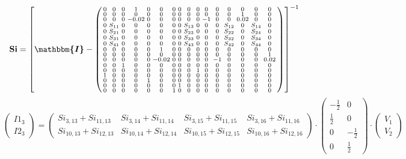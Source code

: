 \documentclass[10pt]{article} \usepackage{amsmath} \usepackage{bbold}
\begin{document}
\[ \mathbf{Si} = \left[ \boldsymbol{\mathbbm{I}}  -
\left(\begin{smallmatrix} 0 & 0 & 0 & 1 & 0 & 0 & 0 & 0 & 0 & 0 & 0 &
0 & 0 & 0 & 0 & 0 \\ 0 & 0 & 0 & 0 & 0 & 0 & 0 & 0 & 0 & 0 & 0 & 0 & 0
& 1 & 0 & 0 \\ 0 & 0 & 0 & -0.02 & 0 & 0 & 0 & 0 & 0 & 0 & -1 & 0 & 0
& 0.02 & 0 & 0 \\ 0 & S_{11} & 0 & 0 & 0 & 0 & 0 & 0 & S_{13} & 0 & 0
& 0 & S_{12} & 0 & S_{14} & 0 \\ 0 & S_{21} & 0 & 0 & 0 & 0 & 0 & 0 &
S_{23} & 0 & 0 & 0 & S_{22} & 0 & S_{24} & 0 \\ 0 & S_{31} & 0 & 0 & 0
& 0 & 0 & 0 & S_{33} & 0 & 0 & 0 & S_{32} & 0 & S_{34} & 0 \\ 0 &
S_{41} & 0 & 0 & 0 & 0 & 0 & 0 & S_{43} & 0 & 0 & 0 & S_{42} & 0 &
S_{44} & 0 \\ 0 & 0 & 0 & 0 & 0 & 1 & 0 & 0 & 0 & 0 & 0 & 0 & 0 & 0 &
0 & 0 \\ 0 & 0 & 0 & 0 & 0 & 0 & 0 & 0 & 0 & 0 & 0 & 0 & 0 & 0 & 0 & 1
\\ 0 & 0 & 0 & 0 & 0 & -0.02 & 0 & 0 & 0 & 0 & 0 & -1 & 0 & 0 & 0 &
0.02 \\ 0 & 0 & 1 & 0 & 0 & 0 & 0 & 0 & 0 & 0 & 0 & 0 & 0 & 0 & 0 & 0
\\ 0 & 0 & 0 & 0 & 0 & 0 & 0 & 0 & 0 & 1 & 0 & 0 & 0 & 0 & 0 & 0 \\ 1
& 0 & 0 & 0 & 0 & 0 & 0 & 0 & 0 & 0 & 0 & 0 & 0 & 0 & 0 & 0 \\ 0 & 0 &
0 & 0 & 1 & 0 & 0 & 0 & 0 & 0 & 0 & 0 & 0 & 0 & 0 & 0 \\ 0 & 0 & 0 & 0
& 0 & 0 & 0 & 1 & 0 & 0 & 0 & 0 & 0 & 0 & 0 & 0 \\ 0 & 0 & 0 & 0 & 0 &
0 & 1 & 0 & 0 & 0 & 0 & 0 & 0 & 0 & 0 & 0 \end{smallmatrix}\right)
\right]^{-1} \]
\[ \left(\begin{array}{c} I1_{3} \\ I2_{3}
\end{array}\right)=\left(\begin{smallmatrix} Si_{3,13} + Si_{11,13} &
Si_{3,14} + Si_{11,14} & Si_{3,15} + Si_{11,15} & Si_{3,16} +
Si_{11,16} \\ Si_{10,13} + Si_{12,13} & Si_{10,14} + Si_{12,14} &
Si_{10,15} + Si_{12,15} & Si_{10,16} + Si_{12,16}
\end{smallmatrix}\right) \cdot \left(\begin{array}{cc} -\frac{1}{2} &
0 \\ \frac{1}{2} & 0 \\ 0 & -\frac{1}{2} \\ 0 & \frac{1}{2}
\end{array}\right)\cdot \left(\begin{array}{c} V_{1} \\ V_{2}
\end{array}\right) \]
\end{document}
